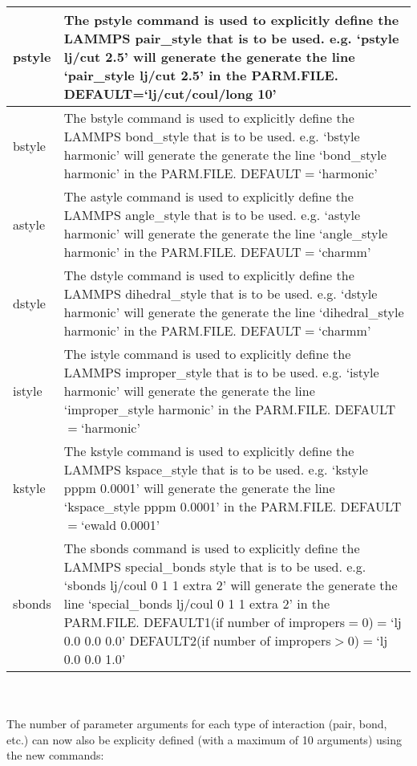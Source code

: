 \documentclass[12pt,letterpaper,]{article}
\begin{document}
\begin{table}[h]
\centering
\begin{tabular}{|l | p{14cm} |}
\hline
pstyle & The pstyle command is used to explicitly define the LAMMPS pair\_style that is to be used. e.g. `pstyle lj/cut 2.5' will generate the generate the line `pair\_style lj/cut 2.5' in the PARM.FILE. DEFAULT=`lj/cut/coul/long 10' \\ \hline
bstyle & The bstyle command is used to explicitly define the LAMMPS bond\_style that is to be used. e.g. `bstyle harmonic' will generate the generate the line `bond\_style harmonic' in the PARM.FILE. DEFAULT$=$`harmonic' \\ \hline
astyle & The astyle command is used to explicitly define the LAMMPS angle\_style that is to be used. e.g. `astyle harmonic' will generate the generate the line `angle\_style harmonic' in the PARM.FILE. DEFAULT$=$`charmm' \\ \hline
dstyle &  The dstyle command is used to explicitly define the LAMMPS dihedral\_style that is to be used. e.g. `dstyle harmonic' will generate the generate the line `dihedral\_style harmonic' in the PARM.FILE. DEFAULT$=$`charmm'\\ \hline
istyle & The istyle command is used to explicitly define the LAMMPS improper\_style that is to be used. e.g. `istyle harmonic' will generate the generate the line `improper\_style harmonic' in the PARM.FILE. DEFAULT$=$`harmonic' \\ \hline
kstyle & The kstyle command is used to explicitly define the LAMMPS kspace\_style that is to be used. e.g. `kstyle pppm 0.0001' will generate the generate the line `kspace\_style pppm 0.0001' in the PARM.FILE. DEFAULT$=$`ewald 0.0001' \\ \hline
sbonds & The sbonds command is used to explicitly define the LAMMPS special\_bonds style that is to be used. e.g. `sbonds lj/coul 0 1 1 extra 2' will generate the generate the line `special\_bonds lj/coul 0 1 1 extra 2' in the PARM.FILE. DEFAULT1(if number of impropers$=$0)$=$`lj 0.0 0.0 0.0'  DEFAULT2(if number of impropers$>$0)$=$`lj 0.0 0.0 1.0'\\ \hline
\end{tabular}
\end{table} \\
\\
The number of parameter arguments for each type of interaction (pair, bond, etc.) can now also be explicity
defined (with a maximum of 10 arguments) using the new commands:
\end{document}
